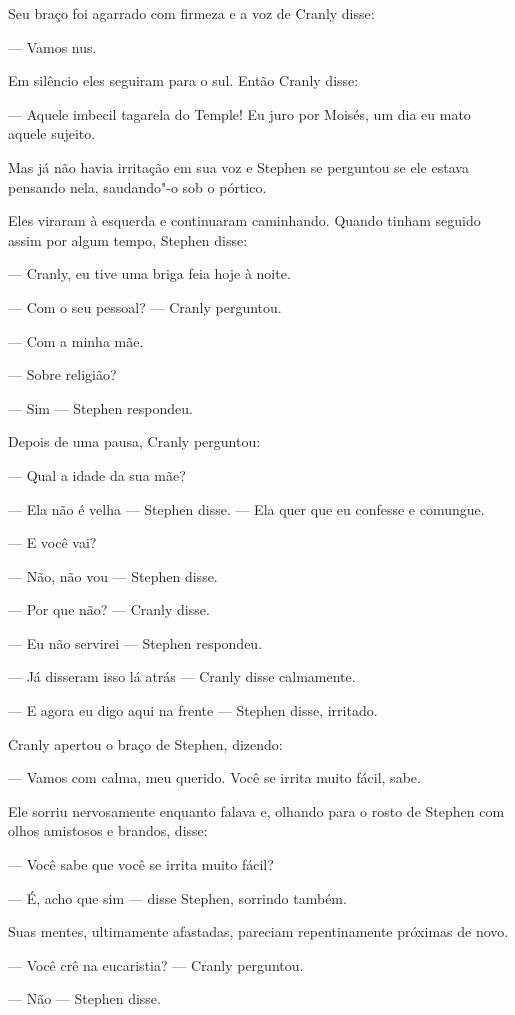 Seu braço foi agarrado com firmeza e a voz de Cranly disse:

 --- Vamos nus.

Em silêncio eles seguiram para o sul. Então Cranly disse:

 --- Aquele imbecil tagarela do Temple! Eu juro por Moisés, um dia eu mato
aquele sujeito.

Mas já não havia irritação em sua voz e Stephen se perguntou se ele
estava pensando nela, saudando"-o sob o pórtico.

Eles viraram à esquerda e continuaram caminhando. Quando tinham seguido
assim por algum tempo, Stephen disse:

 --- Cranly, eu tive uma briga feia hoje à noite.

 --- Com o seu pessoal? --- Cranly perguntou.

 --- Com a minha mãe.

 --- Sobre religião?

 --- Sim --- Stephen respondeu.

Depois de uma pausa, Cranly perguntou:

 --- Qual a idade da sua mãe?

 --- Ela não é velha --- Stephen disse. --- Ela quer que eu confesse e comungue.

 --- E você vai?

 --- Não, não vou --- Stephen disse.

 --- Por que não? --- Cranly disse.

 --- Eu não servirei --- Stephen respondeu.

 --- Já disseram isso lá atrás --- Cranly disse calmamente.

 --- E agora eu digo aqui na frente --- Stephen disse, irritado.

Cranly apertou o braço de Stephen, dizendo:

 --- Vamos com calma, meu querido. Você se irrita muito fácil, sabe.

Ele sorriu nervosamente enquanto falava e, olhando para o rosto de
Stephen com olhos amistosos e brandos, disse:

 --- Você sabe que você se irrita muito fácil?

 --- É, acho que sim --- disse Stephen, sorrindo também.

Suas mentes, ultimamente afastadas, pareciam repentinamente próximas de
novo.

 --- Você crê na eucaristia? --- Cranly perguntou.

 --- Não --- Stephen disse.

